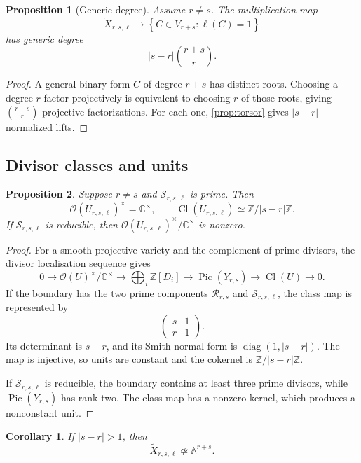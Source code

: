 \documentclass[11pt,reqno]{amsart}
\newtheorem{proposition}[proposition]{Proposition}
\newtheorem{corollary}[corollary]{Corollary}
\theoremstyle{definition}
\theoremstyle{remark}
\newcommand{\A}{\mathbb A}
\newcommand{\C}{\mathbb C}
\newcommand{\Z}{\mathbb Z}
\newcommand{\OO}{\mathcal O}
\newcommand{\cR}{\mathcal R}
\newcommand{\cS}{\mathcal S}
\newcommand{\Cl}{\operatorname{Cl}}
\newcommand{\Pic}{\operatorname{Pic}}
\newcommand{\abs}[1]{\lvert #1\rvert}
\newcommand{\set}[1]{\left\{#1\right\}}
\begin{document}
\begin{proposition}[Generic degree]\label{prop:generic-degree}
Assume $r\ne s$.  The multiplication map
\[
 \widetilde X_{r,s,\ell}\longrightarrow
 \set{C\in V_{r+s}:\ell(C)=1}
\]
has generic degree
\[
 \boxed{\abs{s-r}\binom{r+s}{r}.}
\]
\end{proposition}

\begin{proof}
A general binary form $C$ of degree $r+s$ has distinct roots.  Choosing a
degree-$r$ factor projectively is equivalent to choosing $r$ of those
roots, giving $\binom{r+s}{r}$ projective factorizations.  For each one,
\cref{prop:torsor} gives $\abs{s-r}$ normalized lifts.
\end{proof}

\subsection{Divisor classes and units}

\begin{proposition}\label{prop:class-group}
Suppose $r\ne s$ and $\cS_{r,s,\ell}$ is prime.  Then
\[
 \OO(U_{r,s,\ell})^\times=\C^\times,
 \qquad
 \Cl(U_{r,s,\ell})\simeq\Z/\abs{s-r}\Z.
\]
If $\cS_{r,s,\ell}$ is reducible, then
$\OO(U_{r,s,\ell})^\times/\C^\times$ is nonzero.
\end{proposition}

\begin{proof}
For a smooth projective variety and the complement of prime divisors,
the divisor localisation sequence gives
\[
 0\longrightarrow
 \OO(U)^\times/\C^\times
 \longrightarrow
 \bigoplus_i\Z[D_i]
 \longrightarrow
 \Pic(Y_{r,s})
 \longrightarrow
 \Cl(U)
 \longrightarrow0.
\]
If the boundary has the two prime components $\cR_{r,s}$ and
$\cS_{r,s,\ell}$, the class map is represented by
\[
 \begin{pmatrix}s&1\\ r&1\end{pmatrix}.
\]
Its determinant is $s-r$, and its Smith normal form is
$\operatorname{diag}(1,\abs{s-r})$.  The map is injective, so units are
constant and the cokernel is $\Z/\abs{s-r}\Z$.

If $\cS_{r,s,\ell}$ is reducible, the boundary contains at least three
prime divisors, while $\Pic(Y_{r,s})$ has rank two.  The class map has a
nonzero kernel, which produces a nonconstant unit.
\end{proof}

\begin{corollary}\label{cor:euler-obstruction}
If $\abs{s-r}>1$, then
\[
 \widetilde X_{r,s,\ell}\not\simeq\A^{r+s}.
\]
\end{corollary}
\end{document}
